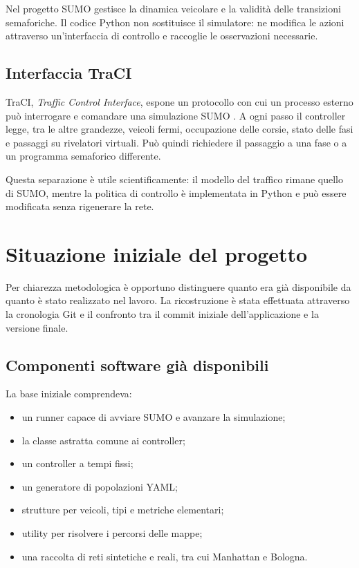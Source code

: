 \documentclass[12pt,a4paper,oneside]{report}
\numberwithin{equation}{chapter}
\begin{document}
Nel progetto SUMO gestisce la dinamica veicolare e la validità delle transizioni
semaforiche. Il codice Python non sostituisce il simulatore: ne modifica le
azioni attraverso un'interfaccia di controllo e raccoglie le osservazioni
necessarie.

\subsection{Interfaccia TraCI}

TraCI, \emph{Traffic Control Interface}, espone un protocollo con cui un
processo esterno può interrogare e comandare una simulazione SUMO
\cite{wegener2008traci,tracidocs2026}. A ogni passo il controller legge, tra le
altre grandezze, veicoli fermi, occupazione delle corsie, stato delle fasi e
passaggi su rivelatori virtuali. Può quindi richiedere il passaggio a una fase
o a un programma semaforico differente.

Questa separazione è utile scientificamente: il modello del traffico rimane
quello di SUMO, mentre la politica di controllo è implementata in Python e può
essere modificata senza rigenerare la rete.

\section{Situazione iniziale del progetto}

Per chiarezza metodologica è opportuno distinguere quanto era già disponibile
da quanto è stato realizzato nel lavoro. La ricostruzione è stata effettuata
attraverso la cronologia Git e il confronto tra il commit iniziale
dell'applicazione e la versione finale.

\subsection{Componenti software già disponibili}

La base iniziale comprendeva:

\begin{itemize}
    \item un runner capace di avviare SUMO e avanzare la simulazione;
    \item la classe astratta comune ai controller;
    \item un controller a tempi fissi;
    \item un generatore di popolazioni YAML;
    \item strutture per veicoli, tipi e metriche elementari;
    \item utility per risolvere i percorsi delle mappe;
    \item una raccolta di reti sintetiche e reali, tra cui Manhattan e Bologna.
\end{itemize}
\end{document}
